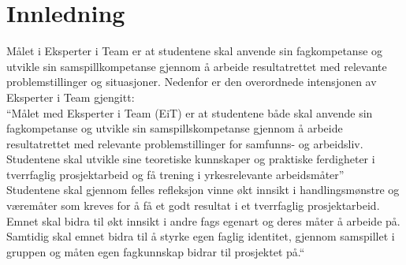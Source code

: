 \section{Innledning}
Målet i Eksperter i Team er at studentene skal anvende sin fagkompetanse
og utvikle sin samspillkompetanse gjennom å arbeide resultatrettet med
relevante problemstillinger og situasjoner. Nedenfor er den overordnede
intensjonen av Eksperter i Team gjengitt:\\

``Målet med Eksperter i Team (EiT) er at studentene både skal anvende
sin fagkompetanse og utvikle sin samspillskompetanse gjennom å arbeide
resultatrettet med relevante problemstillinger for samfunns- og
arbeidsliv. Studentene skal utvikle sine teoretiske kunnskaper og
praktiske ferdigheter i tverrfaglig prosjektarbeid og få trening i
yrkesrelevante arbeidsmåter''\\

Studentene skal gjennom felles refleksjon vinne økt innsikt i
handlingsmønstre og væremåter som kreves for å få et godt resultat i et
tverrfaglig prosjektarbeid. Emnet skal bidra til økt innsikt i andre
fags egenart og deres måter å arbeide på. Samtidig skal emnet bidra til
å styrke egen faglig identitet, gjennom samspillet i gruppen og måten
egen fagkunnskap bidrar til prosjektet på.``

